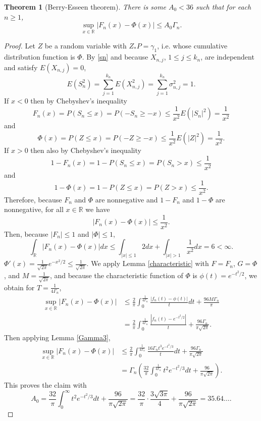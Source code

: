 \documentclass{article}
\newtheorem{theorem}{Theorem}
\theoremstyle{definition}
\begin{document}
\begin{theorem}[Berry-Esseen theorem]
There is some  $A_0<36$ such that for each $n \geq 1$,
\[
\sup_{x \in \mathbb{R}} |F_n(x) - \Phi(x)| \leq A_0 \Gamma_n.
\]
\end{theorem}
\begin{proof}
Let $Z$ be a random variable with $Z_*P=\gamma_1$, i.e.
whose cumulative distribution function is $\Phi$.  
By \eqref{sn} and because $X_{n,j}$, $1 \leq j \leq k_n$, are independent and satisfy $E(X_{n,j})=0$,
\[
E(S_n^2) = \sum_{j=1}^{k_n} E(X_{n,j}^2) = \sum_{j=1}^{k_n} \sigma_{n,j}^2 = 1.
\]
If $x<0$ then  by Chebyshev's inequality 
\[
F_n(x) = P(S_n \leq x) = P(-S_n \geq -x) \leq \frac{1}{x^2} E(|S_n|^2)
=\frac{1}{x^2}
\]
and 
\[
\Phi(x) = P(Z \leq x) = P(-Z \geq -x) \leq \frac{1}{x^2} E(|Z|^2) =\frac{1}{x^2}.
\]
If $x > 0$ then also by Chebyshev's inequality
\[
1-F_n(x) = 1-P(S_n \leq x) = P(S_n > x) \leq \frac{1}{x^2}
\]
and
\[
1-\Phi(x) = 1-P(Z \leq x) = P(Z>x) \leq \frac{1}{x^2}.
\]
Therefore, because $F_n$ and $\Phi$ are nonnegative and $1-F_n$ and $1-\Phi$ are nonnegative, for all $x \in \mathbb{R}$ we have
\[
|F_n(x)-\Phi(x)| \leq \frac{1}{x^2}.
\]
Then, because $|F_n| \leq 1$ and $|\Phi| \leq 1$,
\[
\int_\mathbb{R} |F_n(x)-\Phi(x)| dx \leq 
\int_{|x| \leq 1} 2 dx + \int_{|x|>1} \frac{1}{x^2} dx
=6<\infty.
\]
$\Phi'(x) = \frac{1}{\sqrt{2\pi}} e^{-x^2/2} \leq \frac{1}{\sqrt{2\pi}}$. 
We apply Lemma \ref{characteristic} with $F=F_n$, $G=\Phi$, and $M=\frac{1}{\sqrt{2\pi}}$, and because
the characteristic function of $\Phi$ is $\phi(t)=e^{-t^2/2}$, we
obtain
for $T=\frac{1}{4\Gamma_n}$,
\begin{align*}
\sup_{x \in \mathbb{R}} |F_n(x)-\Phi(x)|&\leq \frac{2}{\pi} \int_0^{\frac{1}{4\Gamma_n}} 
\frac{|f_n(t)-\phi(t)|}{t} dt + \frac{96M \Gamma_n}{\pi}\\
&=\frac{2}{\pi} \int_0^{\frac{1}{4\Gamma_n}} \frac{|f_n(t)-e^{-t^2/2}|}{t} + \frac{96 \Gamma_n}{\pi \sqrt{2\pi}}.
\end{align*}
Then applying Lemma \ref{Gamma3},
\begin{align*}
\sup_{x \in \mathbb{R}} |F_n(x)-\Phi(x)|&\leq \frac{2}{\pi} \int_0^{\frac{1}{4\Gamma_n}} \frac{16\Gamma_n t^3
e^{-t^2/3}}{t} dt+ \frac{96 \Gamma_n}{\pi \sqrt{2\pi}}\\
&=\Gamma_n\left( \frac{32}{\pi} \int_0^{\frac{1}{4\Gamma_n}} t^2 e^{-t^2/3} dt + \frac{96}{\pi\sqrt{2\pi}}\right).
\end{align*}
This proves the claim with
\[
A_0 =  \frac{32}{\pi} \int_0^{\infty} t^2 e^{-t^2/3} dt + \frac{96}{\pi\sqrt{2\pi}} 
=\frac{32}{\pi} \cdot \frac{3\sqrt{3\pi}}{4} + \frac{96}{\pi\sqrt{2\pi}}
=35.64\ldots.
\]
\end{proof}
\end{document}

